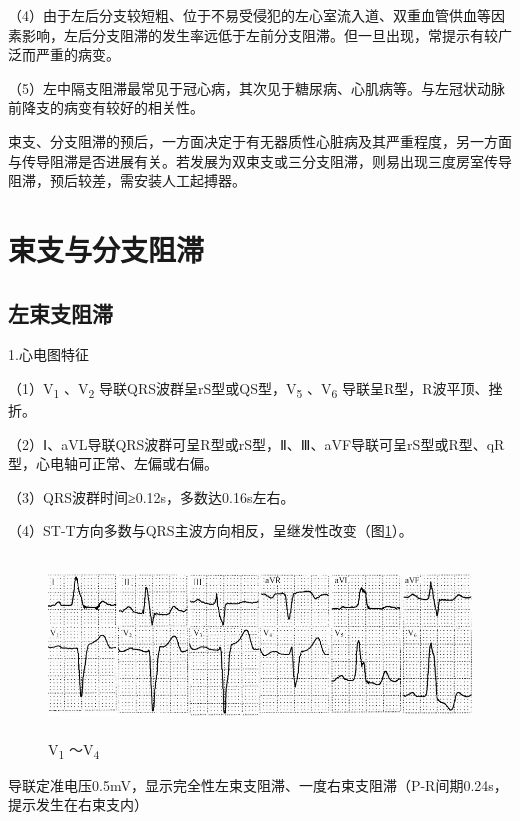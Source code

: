（4）由于左后分支较短粗、位于不易受侵犯的左心室流入道、双重血管供血等因素影响，左后分支阻滞的发生率远低于左前分支阻滞。但一旦出现，常提示有较广泛而严重的病变。

（5）左中隔支阻滞最常见于冠心病，其次见于糖尿病、心肌病等。与左冠状动脉前降支的病变有较好的相关性。

束支、分支阻滞的预后，一方面决定于有无器质性心脏病及其严重程度，另一方面与传导阻滞是否进展有关。若发展为双束支或三分支阻滞，则易出现三度房室传导阻滞，预后较差，需安装人工起搏器。

\protect\hypertarget{text00028.htmlux5cux23subid343}{}{}

\section{束支与分支阻滞}

\protect\hypertarget{text00028.htmlux5cux23subid344}{}{}

\subsection{左束支阻滞}

1.心电图特征

（1）V\textsubscript{1} 、V\textsubscript{2}
导联QRS波群呈rS型或QS型，V\textsubscript{5} 、V\textsubscript{6}
导联呈R型，R波平顶、挫折。

（2）Ⅰ、aVL导联QRS波群可呈R型或rS型，Ⅱ、Ⅲ、aVF导联可呈rS型或R型、qR型，心电轴可正常、左偏或右偏。

（3）QRS波群时间≥0.12s，多数达0.16s左右。

（4）ST-T方向多数与QRS主波方向相反，呈继发性改变（图\ref{fig21-1}）。

\begin{figure}[!htbp]
 \centering
 \includegraphics[width=5.58333in,height=1.875in]{./images/Image00349.jpg}
 \captionsetup{justification=centering}
 \caption{V\textsubscript{1} ～V\textsubscript{4}}
 \label{fig21-1}
  \end{figure} 
导联定准电压0.5mV，显示完全性左束支阻滞、一度右束支阻滞（P-R间期0.24s，提示发生在右束支内）


